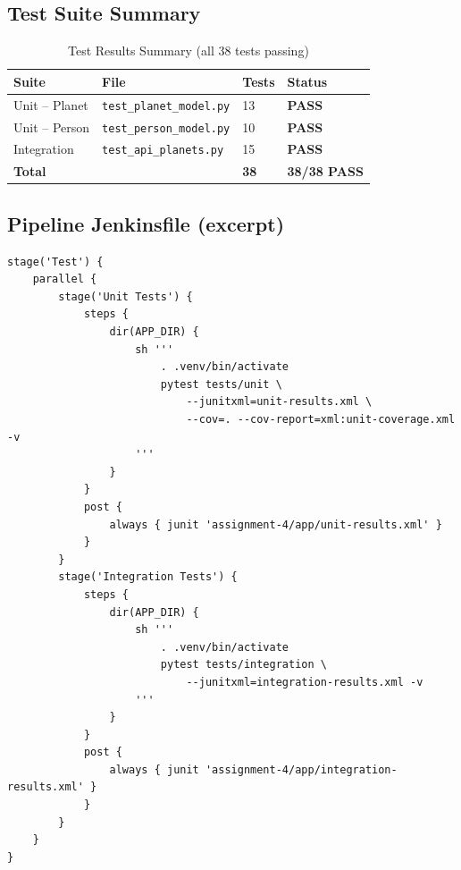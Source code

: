 \documentclass[12pt,a4paper]{article}
\begin{document}
\subsection{Test Suite Summary}

\begin{table}[H]
  \centering
  \caption{Test Results Summary (all 38 tests passing)}
  \label{tab:tests}
  \begin{tabularx}{\linewidth}{lXll}
    \toprule
    \textbf{Suite} & \textbf{File} & \textbf{Tests} & \textbf{Status} \\
    \midrule
    Unit -- Planet  & \texttt{test\_planet\_model.py}  & 13 & \textcolor{codegreen}{\textbf{PASS}} \\
    Unit -- Person  & \texttt{test\_person\_model.py}  & 10 & \textcolor{codegreen}{\textbf{PASS}} \\
    Integration     & \texttt{test\_api\_planets.py}   & 15 & \textcolor{codegreen}{\textbf{PASS}} \\
    \midrule
    \textbf{Total}  & & \textbf{38} & \textcolor{codegreen}{\textbf{38/38 PASS}} \\
    \bottomrule
  \end{tabularx}
\end{table}

\subsection{Pipeline Jenkinsfile (excerpt)}

\begin{lstlisting}[caption={Parallel Test stage from assignment-4/Jenkinsfile}, label={lst:parallel}]
stage('Test') {
    parallel {
        stage('Unit Tests') {
            steps {
                dir(APP_DIR) {
                    sh '''
                        . .venv/bin/activate
                        pytest tests/unit \
                            --junitxml=unit-results.xml \
                            --cov=. --cov-report=xml:unit-coverage.xml -v
                    '''
                }
            }
            post {
                always { junit 'assignment-4/app/unit-results.xml' }
            }
        }
        stage('Integration Tests') {
            steps {
                dir(APP_DIR) {
                    sh '''
                        . .venv/bin/activate
                        pytest tests/integration \
                            --junitxml=integration-results.xml -v
                    '''
                }
            }
            post {
                always { junit 'assignment-4/app/integration-results.xml' }
            }
        }
    }
}
\end{lstlisting}
\end{document}
